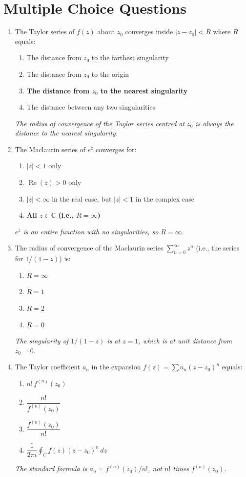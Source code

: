 \documentclass[12pt,a4paper]{article}
\begin{document}
\section{Multiple Choice Questions}

\begin{enumerate}[label=\textbf{MCQ \arabic*.}, leftmargin=*, noitemsep]

\item The Taylor series of $f(z)$ about $z_0$ converges inside $|z-z_0|<R$ where $R$ equals:
\begin{enumerate}[label=(\alph*), noitemsep]
  \item The distance from $z_0$ to the farthest singularity
  \item The distance from $z_0$ to the origin
  \item \textbf{The distance from $z_0$ to the nearest singularity}
  \item The distance between any two singularities
\end{enumerate}
\textit{The radius of convergence of the Taylor series centred at $z_0$ is always the distance to the nearest singularity.}

\item The Maclaurin series of $e^z$ converges for:
\begin{enumerate}[label=(\alph*), noitemsep]
  \item $|z| < 1$ only
  \item $\operatorname{Re}(z) > 0$ only
  \item $|z| < \infty$ in the real case, but $|z|<1$ in the complex case
  \item \textbf{All $z \in \mathbb{C}$ (i.e., $R = \infty$)}
\end{enumerate}
\textit{$e^z$ is an entire function with no singularities, so $R = \infty$.}

\item The radius of convergence of the Maclaurin series $\sum_{n=0}^{\infty} z^n$ (i.e., the series for $1/(1-z)$) is:
\begin{enumerate}[label=(\alph*), noitemsep]
  \item $R = \infty$
  \item \textbf{$R = 1$}
  \item $R = 2$
  \item $R = 0$
\end{enumerate}
\textit{The singularity of $1/(1-z)$ is at $z=1$, which is at unit distance from $z_0=0$.}

\item The Taylor coefficient $a_n$ in the expansion $f(z) = \sum a_n(z-z_0)^n$ equals:
\begin{enumerate}[label=(\alph*), noitemsep]
  \item $n!\, f^{(n)}(z_0)$
  \item $\dfrac{n!}{f^{(n)}(z_0)}$
  \item \textbf{$\dfrac{f^{(n)}(z_0)}{n!}$}
  \item $\dfrac{1}{2\pi i}\oint_C f(z)(z-z_0)^n\,dz$
\end{enumerate}
\textit{The standard formula is $a_n = f^{(n)}(z_0)/n!$, not $n!$ times $f^{(n)}(z_0)$.}


\end{enumerate}
\end{document}

